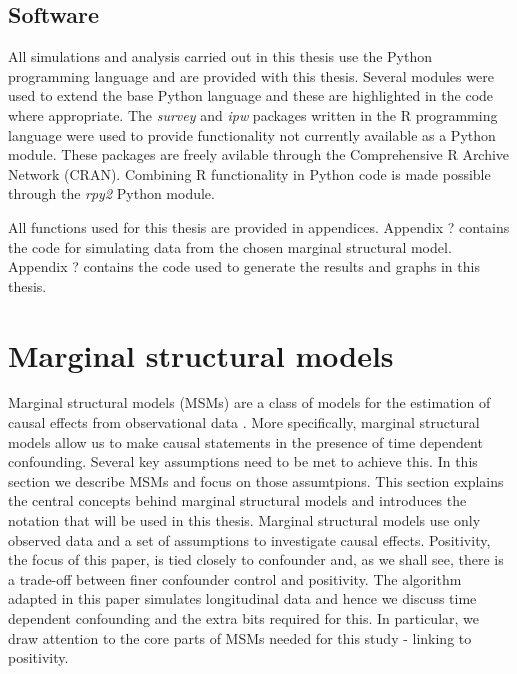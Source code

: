 \documentclass[11pt]{article}
\begin{document}
    \subsection{Software}\label{software}

All simulations and analysis carried out in this thesis use the Python
programming language and are provided with this thesis. Several modules
were used to extend the base Python language and these are highlighted
in the code where appropriate. The \emph{survey} and \emph{ipw} packages
written in the R programming language were used to provide functionality
not currently available as a Python module. These packages are freely
avilable through the Comprehensive R Archive Network (CRAN). Combining R
functionality in Python code is made possible through the \emph{rpy2}
Python module. \linebreak

All functions used for this thesis are provided in appendices. Appendix
? contains the code for simulating data from the chosen marginal
structural model. Appendix ? contains the code used to generate the
results and graphs in this thesis.

    \newpage

    \section{Marginal structural models}\label{marginal-structural-models}

Marginal structural models (MSMs) are a class of models for the
estimation of causal effects from observational data \citet{Robins2000}.
More specifically, marginal structural models allow us to make causal
statements in the presence of time dependent confounding. Several key
assumptions need to be met to achieve this. In this section we describe
MSMs and focus on those assumtpions. This section explains the central
concepts behind marginal structural models and introduces the notation
that will be used in this thesis. Marginal structural models use only
observed data and a set of assumptions to investigate causal effects.
Positivity, the focus of this paper, is tied closely to confounder and,
as we shall see, there is a trade-off between finer confounder control
and positivity. The algorithm adapted in this paper simulates
longitudinal data and hence we discuss time dependent confounding and
the extra bits required for this. In particular, we draw attention to
the core parts of MSMs needed for this study - linking to positivity.
\end{document}
